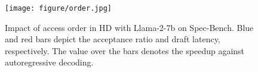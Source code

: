 \begin{figure}[t!]
\centering
\texttt{[image: figure/order.jpg]}
\vspace{-1.1em}
\caption{\small Impact of access order in HD with Llama-2-7b on Spec-Bench. Blue and red bars depict the acceptance ratio and draft latency, respectively. The value over the bars denotes the speedup against autoregressive decoding.}
\label{fig:order}
\vspace{-.5em}
\end{figure}